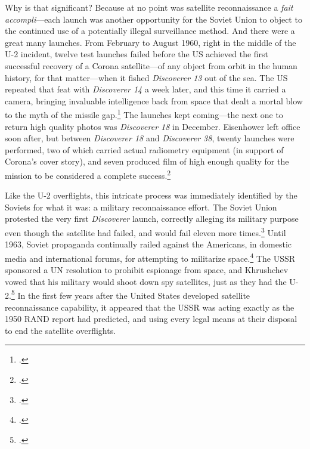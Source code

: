 \documentclass[11pt]{memoir}
\begin{document}
Why is that significant? Because at no point was satellite reconnaissance a \emph{fait accompli}---each launch was another opportunity for the Soviet Union to object to the continued use of a potentially illegal surveillance method. And there were a great many launches. From February to August 1960, right in the middle of the U-2 incident, twelve test launches failed before the US achieved the first successful recovery of a Corona satellite---of any object from orbit in the human history, for that matter---when it fished \emph{Discoverer 13} out of the sea. The US repeated that feat with \emph{Discoverer 14} a week later, and this time it carried a camera, bringing invaluable intelligence back from space that dealt a mortal blow to the myth of the missile gap.\footcite[p.~101-102. The previous failures had been so demoralizing that \emph{Discoverer 13} only carried diagnostic equipment, which made its success all the more exciting. Ships on standby were able to retrieve the satellite even though it fell outside the recovery zone---\emph{Discoverer 13} many not have landed in the ballpark or the outfield, but in many respects, the mission was a home run.]{lindgren_trust_2000} The launches kept coming---the next one to return high quality photos was \emph{Discoverer 18} in December. Eisenhower left office soon after, but between \emph{Discoverer 18} and \emph{Discoverer 38}, twenty launches were performed, two of which carried actual radiometry equipment (in support of Corona's cover story), and seven produced film of high enough quality for the mission to be considered a complete success.\footcite[p.~103]{lindgren_trust_2000}

Like the U-2 overflights, this intricate process was immediately identified by the Soviets for what it was: a military reconnaissance effort. The Soviet Union protested the very first \emph{Discoverer} launch, correctly alleging its military purpose even though the satellite had failed, and would fail eleven more times.\footcite[p.~140]{day_eye_2015} Until 1963, Soviet propaganda continually railed against the Americans, in domestic media and international forums, for attempting to militarize space.\footcite[p.~271]{mcdougall_heavens_1985} The USSR sponsored a UN resolution to prohibit espionage from space, and Khrushchev vowed that his military would shoot down spy satellites, just as they had the U-2.\footcite[p.~166]{day_eye_2015} In the first few years after the United States developed satellite reconnaissance capability, it appeared that the USSR was acting exactly as the 1950 RAND report had predicted, and using every legal means at their disposal to end the satellite overflights.
\end{document}
